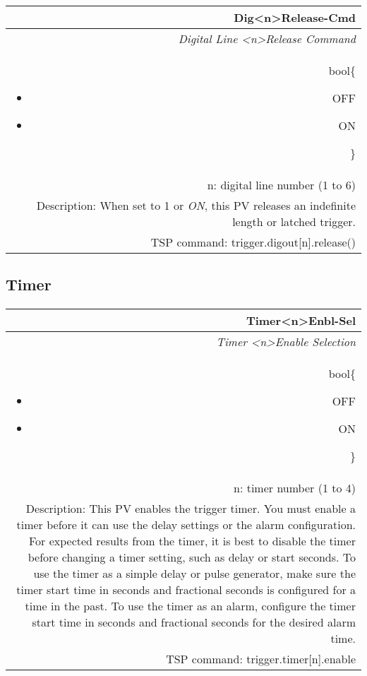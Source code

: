\documentclass[openany]{article}
\begin{document}
		\begin{tabular}{N}
			\hline
			\bfseries Dig{\textless n\textgreater}Release-Cmd\label{pv:digrelease-cmd} \\ \hline
			\emph{Digital Line \textless n\textgreater Release Command} \\
			bool\{\begin{itemize}[noitemsep]
				\small
				\item[] OFF
				\item[] ON
			\end{itemize}\} \\
			n: digital line number (1 to 6) \\
			Description: When set to 1 or \emph{ON}, this PV releases an indefinite length or latched trigger. \\
			TSP command: trigger.digout[n].release()
		\end{tabular}

	\subsection{Timer}\label{pvgroup:timer}

		\paragraph{} %

		\begin{tabular}{N}
			\hline
			\bfseries Timer{\textless n\textgreater}Enbl-Sel\label{pv:timerenbl-sel} \\ \hline
			\emph{Timer \textless n\textgreater Enable Selection} \\
			bool\{\begin{itemize}[noitemsep]
				\small
				\item[] OFF
				\item[] ON
			\end{itemize}\} \\
			n: timer number (1 to 4) \\
			Description: This PV enables the trigger timer. You must enable a timer before it can use the delay settings or the alarm configuration. For expected results from the timer, it is best to disable the timer before changing a timer setting, such as delay or start seconds. To use the timer as a simple delay or pulse generator, make sure the timer start time in seconds and fractional seconds is configured for a time in the past. To use the timer as an alarm, configure the timer start time in seconds and fractional seconds for the desired alarm time.\\
			TSP command: trigger.timer[n].enable
		\end{tabular}
\end{document}
